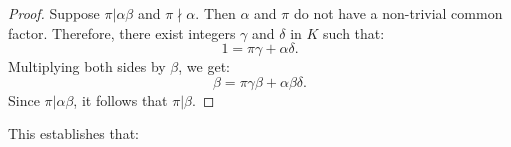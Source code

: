\documentclass{article}
\begin{document}

\begin{proof}
Suppose \( \pi | \alpha \beta \) and \( \pi \nmid \alpha \). Then \( \alpha \) and \( \pi \) do not have a non-trivial common factor. Therefore, there exist integers \( \gamma \) and \( \delta \) in \( K \) such that:
\[
1 = \pi \gamma + \alpha \delta.
\]
Multiplying both sides by \( \beta \), we get:
\[
\beta = \pi \gamma \beta + \alpha \beta \delta.
\]
Since \( \pi | \alpha \beta \), it follows that \( \pi | \beta \).
\end{proof}

This establishes that:


\end{document}
